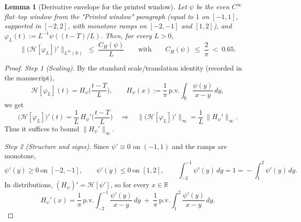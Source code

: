 \documentclass[11pt]{article}
\newtheorem{lemma}[theorem]{Lemma}
\theoremstyle{definition}
\theoremstyle{remark}
\theoremstyle{definition}
\begin{document}
\begin{lemma}[Derivative envelope for the printed window]\label{lem:CH-derivative-explicit}
Let $\psi$ be the even $C^\infty$ flat--top window from the "Printed window" paragraph (equal to $1$ on $[-1,1]$, supported in $[-2,2]$, with monotone ramps on $[-2,-1]$ and $[1,2]$), and $\varphi_L(t):=L^{-1}\psi((t-T)/L)$. Then, for every $L>0$,
\[
  \big\|\big(\mathcal H[\varphi_L]\big)'\big\|_{L^\infty(\mathbb R)} \;\le\; \frac{C_H(\psi)}{L}
  \qquad\text{with}\qquad C_H(\psi)\;\le\;\frac{2}{\pi}\;<\;0.65.
\]
\end{lemma}
\begin{proof}
\textit{Step 1 (Scaling).} By the standard scale/translation identity (recorded in the manuscript),
\[
  \mathcal H[\varphi_L](t)=H_\psi\!\Big(\frac{t-T}{L}\Big),\qquad
  H_\psi(x):=\frac{1}{\pi}\,\mathrm{p.v.}\!\int_{\mathbb R}\frac{\psi(y)}{x-y}\,dy,
\]
we get
\[
  \big(\mathcal H[\varphi_L]\big)'(t)=\frac{1}{L}\,H_\psi'\!\Big(\frac{t-T}{L}\Big)
  \quad\Longrightarrow\quad
  \big\|\big(\mathcal H[\varphi_L]\big)'\big\|_\infty=\frac{1}{L}\,\|H_\psi'\|_\infty.
\]
Thus it suffices to bound $\|H_\psi'\|_\infty$.

\smallskip
\textit{Step 2 (Structure and signs).} Since $\psi'\equiv0$ on $(-1,1)$ and the ramps are monotone,
\[
  \psi'(y)\ge0\ \text{on }[-2,-1],\qquad \psi'(y)\le0\ \text{on }[1,2],\qquad
  \int_{-2}^{-1}\psi'(y)\,dy=1=\!-\!\int_{1}^{2}\psi'(y)\,dy.
\]
In distributions, $(H_\psi)'= \mathcal H[\psi']$, so for every $x\in\mathbb R$
\[
  H_\psi'(x)=\frac{1}{\pi}\,\mathrm{p.v.}\!\int_{-2}^{-1}\frac{\psi'(y)}{x-y}\,dy\;+\;
             \frac{1}{\pi}\,\mathrm{p.v.}\!\int_{1}^{2}\frac{\psi'(y)}{x-y}\,dy.
\]


\end{proof}
\end{document}
